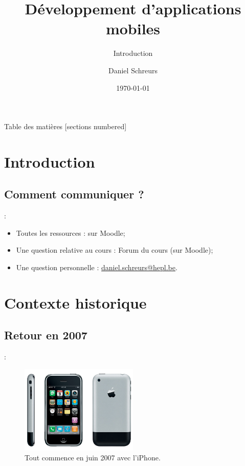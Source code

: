 \documentclass[10pt]{beamer}
\title{Développement d'applications mobiles}
\subtitle{Introduction}
\date{\today}
\author{Daniel Schreurs}
\institute{Haute École de la Province de Liège}
\begin{document}
\maketitle

\begin{frame}[allowframebreaks]{Table des matières}
    [sections numbered]
    \tableofcontents
\end{frame}

\section{Introduction}

\subsection{Comment communiquer ?}
\begin{frame}{\secname : \subsecname}
    \begin{itemize}
        \item Toutes les ressources : sur Moodle;
        \item Une question relative au cours : Forum du cours (sur Moodle);
        \item Une question personnelle : \href{mailto:daniel.schreurs@hepl.be}{daniel.schreurs@hepl.be}.
    \end{itemize}
\end{frame}

\section{Contexte historique}
\subsection{Retour en 2007}
\begin{frame}[fragile,t]{\secname : \subsecname}
    \begin{figure}
        \begin{center}
            \includegraphics[width=0.5\textwidth]{../assets/img/Originele-iPhone.jpg}
            \caption*{Tout commence en juin 2007 avec l'iPhone.}
            \label{Fig:Originele-iPhone}
        \end{center}
    \end{figure}
\end{frame}
\end{document}
